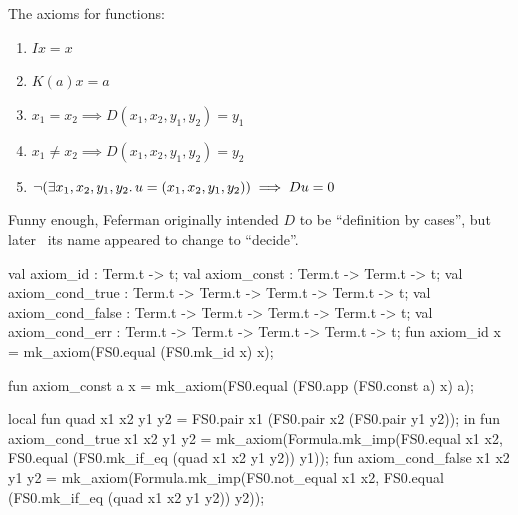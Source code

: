 \begin{node}
The axioms for functions:
\begin{enumerate}
\item $Ix=x$
\item $K(a)x=a$
\item $x_{1}=x_{2}\implies D(x_{1},x_{2},y_{1},y_{2})=y_{1}$
\item $x_{1}\neq x_{2}\implies D(x_{1},x_{2},y_{1},y_{2})=y_{2}$
\item $\neg(\exists x_{1},x_{2},y_{1},y_{2}\ldotp u=(x_{1},x_{2},y_{1},y_{2}))\implies Du=0$
\end{enumerate}
Funny enough, Feferman originally intended $D$ to be ``definition by
cases'', but later~\cite[\S5.3]{feferman1982inductively} its name appeared to change to ``decide''.
\end{node}


\nwenddocs{}\plusendmoddef\nwstartdeflinemarkup{}\nwenddeflinemarkup
val axiom_id : Term.t -> t;
val axiom_const : Term.t -> Term.t -> t;
val axiom_cond_true : Term.t -> Term.t -> Term.t -> Term.t -> t;
val axiom_cond_false : Term.t -> Term.t -> Term.t -> Term.t -> t;
val axiom_cond_err : Term.t -> Term.t -> Term.t -> Term.t -> t;
\nwendcode{}\nwdocspar
\nwenddocs{}\plusendmoddef\nwstartdeflinemarkup{}\nwenddeflinemarkup
fun axiom_id x = mk_axiom(FS0.equal (FS0.mk_id x) x);

fun axiom_const a x = mk_axiom(FS0.equal (FS0.app (FS0.const a) x) a);

local
  fun quad x1 x2 y1 y2 = FS0.pair x1 (FS0.pair x2 (FS0.pair y1 y2));
in
fun axiom_cond_true x1 x2 y1 y2 =
  mk_axiom(Formula.mk_imp(FS0.equal x1 x2,
                              FS0.equal (FS0.mk_if_eq (quad x1 x2 y1 y2))
                                        y1));
fun axiom_cond_false x1 x2 y1 y2 =
  mk_axiom(Formula.mk_imp(FS0.not_equal x1 x2,
                              FS0.equal (FS0.mk_if_eq (quad x1 x2 y1 y2))
                                        y2));

